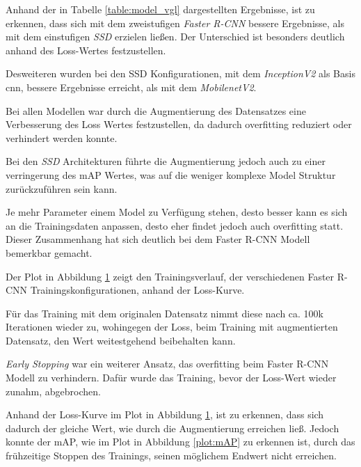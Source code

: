 Anhand der in Tabelle \ref{table:model_vgl} dargestellten 
Ergebnisse, ist zu erkennen, dass sich mit dem zweistufigen 
\textit{Faster R-CNN} bessere Ergebnisse, als mit dem einstufigen
\textit{SSD} erzielen ließen.
Der Unterschied ist besonders deutlich anhand des Loss-Wertes 
festzustellen.

Desweiteren wurden bei den SSD Konfigurationen, mit dem 
\textit{InceptionV2}
als Basis \Gls{cnn}, bessere Ergebnisse erreicht, als mit dem 
\textit{MobilenetV2}.

Bei allen Modellen war durch die Augmentierung des 
Datensatzes eine Verbesserung des Loss Wertes festzustellen, 
da dadurch \Gls{overfitting} reduziert
oder verhindert werden konnte.

Bei den \textit{SSD} Architekturen führte die Augmentierung
jedoch auch zu einer verringerung des mAP Wertes, 
was auf die weniger komplexe Model Struktur zurückzuführen sein kann.

Je mehr Parameter einem Model zu Verfügung stehen, desto besser kann 
es sich an die Trainingsdaten anpassen, desto eher findet jedoch
auch \Gls{overfitting} statt.
Dieser Zusammenhang hat sich deutlich bei dem Faster R-CNN 
Modell bemerkbar gemacht.

Der Plot in Abbildung \ref{plot:loss} zeigt den Trainingsverlauf, 
der verschiedenen Faster R-CNN
Trainingskonfigurationen, anhand der Loss-Kurve.

Für das Training mit dem originalen Datensatz nimmt diese nach ca.
100k Iterationen wieder zu, wohingegen der Loss, beim Training 
mit augmentierten Datensatz, den Wert weitestgehend beibehalten 
kann.

\textit{Early Stopping} war ein weiterer Ansatz, das 
\Gls{overfitting} beim Faster R-CNN Modell zu verhindern.
Dafür wurde das Training, bevor der Loss-Wert 
wieder zunahm, abgebrochen.

Anhand der Loss-Kurve im Plot in Abbildung \ref{plot:loss}, 
ist zu erkennen, dass sich dadurch der gleiche
Wert, wie durch die Augmentierung erreichen ließ.
Jedoch konnte der mAP, wie im Plot in Abbildung \ref{plot:mAP}
zu erkennen ist, durch das frühzeitige Stoppen des 
Trainings, seinen möglichem Endwert nicht erreichen.


\vspace{0.5cm}
\begin{figure}[H]
\begin{minipage}{0.5\textwidth}
  \centering
  \def\svgwidth{0.95\textwidth}
  
  \label{plot:mAP}
\end{minipage}
\begin{minipage}{0.5\textwidth}
  \centering
  \def\svgwidth{0.95\textwidth}
  
  \label{plot:loss}
\end{minipage}
\end{figure}

